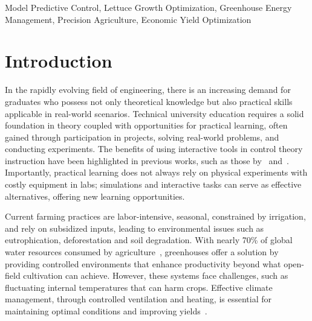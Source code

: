 \documentclass[conference]{IEEEtran}
\begin{document}
\begin{IEEEkeywords}
    Model Predictive Control, Lettuce Growth Optimization, Greenhouse Energy Management, Precision Agriculture, Economic Yield Optimization
\end{IEEEkeywords}

\section{Introduction}

In the rapidly evolving field of engineering, there is an increasing demand for graduates who possess not only theoretical knowledge but also practical skills applicable in real-world scenarios. Technical university education requires a solid foundation in theory coupled with opportunities for practical learning, often gained through participation in projects, solving real-world problems, and conducting experiments. The benefits of using interactive tools in control theory instruction have been highlighted in previous works, such as those by~\cite{Emami1991} and~\cite{Guzman2013}. Importantly, practical learning does not always rely on physical experiments with costly equipment in labs; simulations and interactive tasks can serve as effective alternatives, offering new learning opportunities.

Current farming practices are labor-intensive, seasonal, constrained by irrigation, and rely on subsidized inputs, leading to environmental issues such as eutrophication, deforestation and soil degradation. With nearly 70\% of global water resources consumed by agriculture~\cite{Debroy2024}, greenhouses offer a solution by providing controlled environments that enhance productivity beyond what open-field cultivation can achieve. However, these systems face challenges, such as fluctuating internal temperatures that can harm crops. Effective climate management, through controlled ventilation and heating, is essential for maintaining optimal conditions and improving yields~\cite{Wu2019}.
\end{document}
